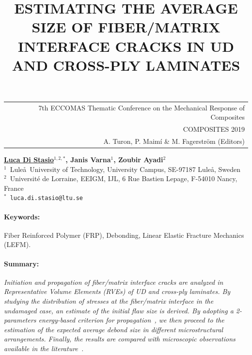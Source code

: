 \documentclass[12pt,a4paper]{article}
\begin{document}
\thispagestyle{empty}

\vspace*{-3.4cm}
\begin{table}[!h]
\begin{tabular}{r}
\hspace*{5.5cm} \scriptsize \textsf{7th ECCOMAS Thematic Conference on the Mechanical Response of Composites} \\
\hspace*{5.5cm} \scriptsize \textsf{ COMPOSITES 2019} \\
\hspace*{5.5cm} \tiny \textsf{A. Turon, P. Maimí \& M. Fagerström (Editors)}
\end{tabular}
\end{table}

\begin{center}
\title{ESTIMATING THE AVERAGE SIZE OF FIBER/MATRIX INTERFACE CRACKS IN UD AND CROSS-PLY LAMINATES}
\end{center}
\begin{center}
\textbf{\underline{Luca Di Stasio}$^{1,2,*}$, Janis Varna$^{1}$, Zoubir Ayadi$^{2}$} \\ [7pt]
\small{$^1$~Lule\aa\ University of Technology, University Campus, SE-97187 Lule\aa, Sweden}  \\  [2pt]  
\small{$^2$~Universit\'e de Lorraine, EEIGM, IJL, 6 Rue Bastien Lepage, F-54010 Nancy, France}  \\  [2pt]
\small{$^*$~\texttt{luca.di.stasio@ltu.se}} \\
\end{center}


\paragraph{Keywords:} Fiber Reinforced Polymer (FRP), Debonding, Linear Elastic Fracture Mechanics (LEFM).

\paragraph{Summary:} \textit{Initiation and propagation of fiber/matrix interface cracks are analyzed in Representative Volume Elements (RVEs) of UD and cross-ply laminates. By studying the distribution of stresses at the fiber/matrix interface in the undamaged case, an estimate of the initial flaw size is derived. By adopting a 2-parameters energy-based criterion for propagation~\cite{Hutchinson1991}, we then proceed to the estimation of the expected average debond size in different microstructural arrangements. Finally, the results are compared with microscopic observations available in the literature~\cite{Correa2018}.}
\end{document}
